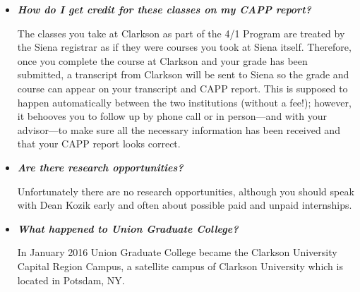 \documentclass[12pt]{article}
\begin{document}
\begin{itemize}
\item{{\bf {\em How do I get credit for these classes on my CAPP report?}}

The classes you take at Clarkson as part of the 4/1 Program are treated by the
Siena registrar as if they were courses you took at Siena itself.  Therefore,
once you complete the course at Clarkson and your grade has been submitted, a
transcript from Clarkson will be sent to Siena so the grade and course can
appear on your transcript and CAPP report.  This is supposed to happen
automatically between the two institutions (without a fee!); however, it
behooves you to follow up by phone call or in person---and with your
advisor---to make sure all the necessary information has been received and that
your CAPP report looks correct.}

\item{{\bf {\em Are there research opportunities?}}

Unfortunately there are no research opportunities, although you should speak
with Dean Kozik early and often about possible paid and unpaid internships.}



\item{{\bf {\em What happened to Union Graduate College?}}

  In January 2016 Union Graduate College became the Clarkson University Capital
  Region Campus, a satellite campus of Clarkson University which is located in
  Potsdam, NY.}
\end{itemize}
  
\end{document}
